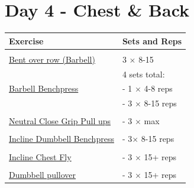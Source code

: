 \documentclass[11pt]{article}
\begin{document}
\section*{Day 4 - Chest \& Back}
\begin{center}
\begin{tabular}{|l|l|}
\hline
\textbf{Exercise} & \textbf{Sets and Reps}\\
\hline
&\\
\href{https://www.youtube.com/shorts/3OAG3sTlljk}{Bent over row (Barbell)} & 3 $\times$ 8-15 \\
\hline
& 4 sets total: \\
\href{https://www.youtube.com/shorts/0cXAp6WhSj4}{Barbell Benchpress} & - 1  $\times$ 4-8 reps \\
& - 3  $\times$ 8-15 reps \\
\hline
&\\
\href{https://www.youtube.com/watch?v=cd_38C6LuvY}{Neutral Close Grip Pull ups} & - 3 $\times$ max \\
\hline
&\\
\href{https://www.youtube.com/watch?v=0f6-uCUKqgA}{Incline Dumbbell Benchpress} &  - 3$\times$ 8-15 reps \\
\hline
&\\
\href{https://www.youtube.com/watch?v=ajdFwa-qM98}{Incline Chest Fly} & - 3 $\times$ 15+ reps\\
\hline
&\\
\href{https://www.youtube.com/watch?v=FK4rHfWKEac}{Dumbbell pullover} & - 3 $\times$ 15+ reps\\
\hline
\end{tabular}
\end{center}
\end{document}
